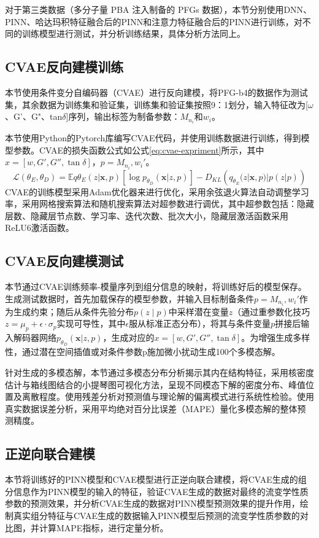 对于第三类数据（多分子量 PBA 注入制备的 PFGs 数据），本节分别使用DNN、PINN、哈达玛积特征融合后的PINN和注意力特征融合后的PINN进行训练，对不同的训练模型进行测试，并分析训练结果，具体分析方法同上。

\subsection{CVAE反向建模训练}
本节使用条件变分自编码器（CVAE）进行反向建模，将PFG-b4的数据作为测试集，其余数据为训练集和验证集，训练集和验证集按照9：1划分，输入特征改为[$\omega$、G'、G"、tan$\delta$]序列，输出标签为制备参数：$M_{n_i}$和$w_i$。

本节使用Python的Pytorch库编写CVAE代码，并使用训练数据进行训练，得到模型参数。CVAE的损失函数公式如公式\eqref{eq:cvae-expriment}所示，其中$x = [w, G', G'', \tan \delta]$，$p = { M_{n_i}, w_i }'$。
\begin{equation}
  \mathcal{L}(\theta_E, \theta_D) = \mathbb{E}{q{\theta_E}(z|\mathbf{x},p)} \left[ \log p_{\theta_D}(\mathbf{x}|z,p) \right] - D_{KL}\left(q_{\theta_E}(z|\mathbf{x},p) | p(z|p)\right) \label{eq:cvae-expriment}
\end{equation}
CVAE的训练模型采用Adam优化器来进行优化，采用余弦退火算法自动调整学习率，采用网格搜索算法和随机搜索算法对超参数进行调优，其中超参数包括：隐藏层数、隐藏层节点数、学习率、迭代次数、批次大小，隐藏层激活函数采用ReLU6激活函数。
\subsection{CVAE反向建模测试}
本节通过CVAE训练频率-模量序列到组分信息的映射，将训练好后的模型保存。生成测试数据时，首先加载保存的模型参数，并输入目标制备条件$p = { M_{n_i}, w_i }'$作为生成约束；随后从条件先验分布$p(z∣p)$中采样潜在变量$z$（通过重参数化技巧$z=\mu_p+\epsilon⋅\sigma_p$实现可导性，其中$\epsilon$服从标准正态分布），将其与条件变量$p$拼接后输入解码器网络$p_{\theta_D}(\mathbf{x}|z,p)$，生成对应的$x = [w, G', G'', \tan \delta]$。为增强生成多样性，通过潜在空间插值或对条件参数p施加微小扰动生成100个多模态解。

针对生成的多模态解，本节通过多模态分布分析揭示其内在结构特征，采用核密度估计与箱线图结合的小提琴图可视化方法，呈现不同模态下解的密度分布、峰值位置及离散程度。使用残差分析对预测值与理论解的偏离模式进行系统性检验。使用真实数据误差分析，采用平均绝对百分比误差（MAPE）量化多模态解的整体预测精度。

\subsection{正逆向联合建模}
本节将训练好的PINN模型和CVAE模型进行正逆向联合建模，将CVAE生成的组分信息作为PINN模型的输入的特征，验证CVAE生成的数据对最终的流变学性质参数的预测效果，并分析CVAE生成的数据对PINN模型预测效果的提升作用，绘制真实组分特征与CVAE生成的数据输入PINN模型后预测的流变学性质参数的对比图，并计算MAPE指标，进行定量分析。

